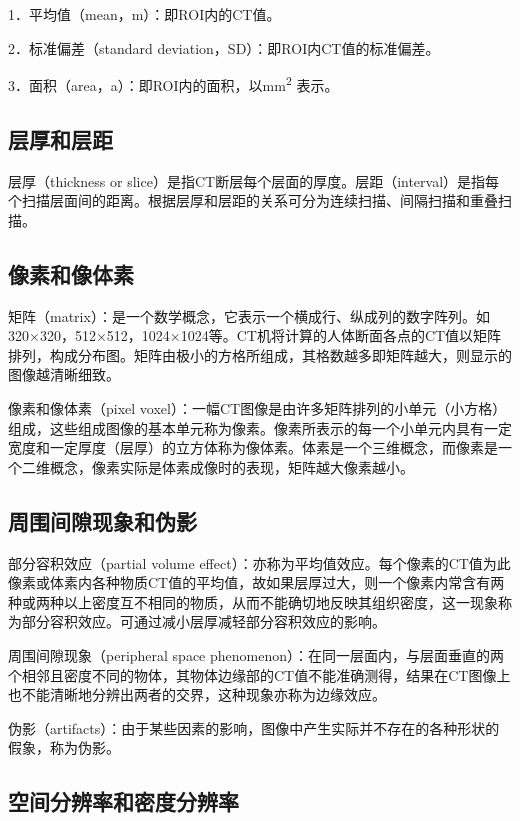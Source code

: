 1．平均值（mean，m）：即ROI内的CT值。

2．标准偏差（standard deviation，SD）：即ROI内CT值的标准偏差。

3．面积（area，a）：即ROI内的面积，以mm\textsuperscript{2} 表示。

\subsection{层厚和层距}

层厚（thickness or
slice）是指CT断层每个层面的厚度。层距（interval）是指每个扫描层面间的距离。根据层厚和层距的关系可分为连续扫描、间隔扫描和重叠扫描。

\subsection{像素和像体素}

矩阵（matrix）：是一个数学概念，它表示一个横成行、纵成列的数字阵列。如320×320，512×512，1024×1024等。CT机将计算的人体断面各点的CT值以矩阵排列，构成分布图。矩阵由极小的方格所组成，其格数越多即矩阵越大，则显示的图像越清晰细致。

像素和像体素（pixel
voxel）：一幅CT图像是由许多矩阵排列的小单元（小方格）组成，这些组成图像的基本单元称为像素。像素所表示的每一个小单元内具有一定宽度和一定厚度（层厚）的立方体称为像体素。体素是一个三维概念，而像素是一个二维概念，像素实际是体素成像时的表现，矩阵越大像素越小。

\subsection{周围间隙现象和伪影}

部分容积效应（partial volume
effect）：亦称为平均值效应。每个像素的CT值为此像素或体素内各种物质CT值的平均值，故如果层厚过大，则一个像素内常含有两种或两种以上密度互不相同的物质，从而不能确切地反映其组织密度，这一现象称为部分容积效应。可通过减小层厚减轻部分容积效应的影响。

周围间隙现象（peripheral space
phenomenon）：在同一层面内，与层面垂直的两个相邻且密度不同的物体，其物体边缘部的CT值不能准确测得，结果在CT图像上也不能清晰地分辨出两者的交界，这种现象亦称为边缘效应。

伪影（artifacts）：由于某些因素的影响，图像中产生实际并不存在的各种形状的假象，称为伪影。

\subsection{空间分辨率和密度分辨率}

